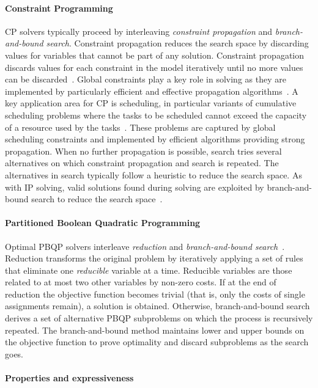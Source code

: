 \documentclass[acmsmall,authorversion,nonacm]{acmart}
\begin{document}
\paragraph{Constraint Programming}

CP solvers typically proceed by interleaving \emph{constraint
  propagation} and \emph{branch-and-bound search}.
Constraint propagation reduces the search space by discarding values
for variables that cannot be part of any solution.
Constraint propagation discards values for each constraint in the
model iteratively until no more values can be
discarded~\cite{CPH:prop}.
Global constraints play a key role in solving as they are implemented
by particularly efficient and effective propagation
algorithms~\cite{CPH:global}.
A key application area for CP is scheduling, in particular variants of
cumulative scheduling problems where the tasks to be scheduled cannot
exceed the capacity of a resource used by the
tasks~\cite{Baptiste2001,CPH:scheduling}. These problems are
captured by global scheduling constraints and implemented
by efficient algorithms providing strong propagation.
When no further propagation is possible, search tries several
alternatives on which constraint propagation and search is repeated.
The alternatives in search typically follow a heuristic to reduce the
search space.
As with IP solving, valid solutions found during solving are exploited
by branch-and-bound search to reduce the search
space~\cite{CPH:search}.

\paragraph{Partitioned Boolean Quadratic Programming}

Optimal PBQP solvers interleave \emph{reduction} and
\emph{branch-and-bound search}~\cite{Hames2006}.
Reduction transforms the original problem by iteratively applying a
set of rules that eliminate one \emph{reducible} variable at a time.
Reducible variables are those related to at most two other variables
by non-zero costs.
If at the end of reduction the objective function becomes trivial
(that is, only the costs of single assignments  remain), a
solution is obtained.
Otherwise, branch-and-bound search derives a set of alternative PBQP
subproblems on which the process is recursively repeated.
The branch-and-bound method maintains lower and upper bounds on the
objective function to prove optimality and discard subproblems as the
search goes.

\paragraph{Properties and expressiveness}
\end{document}
